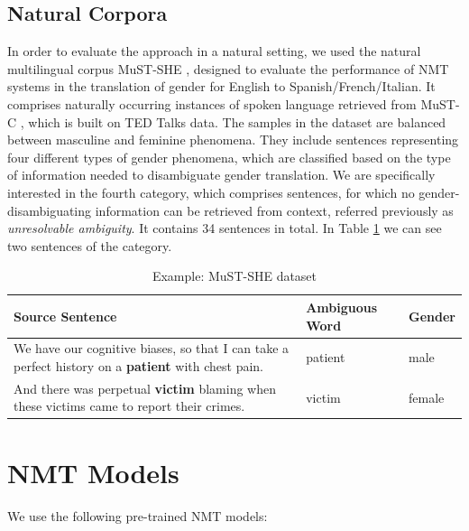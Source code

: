 \subsection{Natural Corpora}
\label{sec:Experiments:Natural_Corpora}

In order to evaluate the approach in a natural setting, we used the natural multilingual corpus MuST-SHE \parencite{MuST-SHE}, designed to evaluate the performance of NMT systems in the translation of gender for English to Spanish/French/Italian. It comprises naturally occurring instances of spoken language retrieved from MuST-C \parencite{MuST-C}, which is built on TED Talks data. The samples in the dataset are balanced between masculine and feminine phenomena. They include sentences representing four different types of gender phenomena, which are classified based
on the type of information needed to disambiguate gender translation. We are specifically interested in the fourth category, which comprises sentences, for which no gender-disambiguating information can be retrieved from context, referred previously as \textit{unresolvable ambiguity}. It contains 34 sentences in total. In Table \ref{tab:mustshe} we can see two sentences of the category. 

\begin{table} 
    \label{tab:mustshe}
    \begin{tabularx}{\linewidth}{|X|l|l|}
        \hline
        \textbf{Source Sentence} & \textbf{Ambiguous Word} & \textbf{Gender} \\ \hline
        We have our cognitive biases, so that I can take a perfect history on a \textbf{patient} with chest pain. & patient & male \\ \hline
        And there was perpetual \textbf{victim} blaming when these victims came to report their crimes. & victim & female \\ \hline
    \end{tabularx}
    \caption{Example: MuST-SHE dataset}
\end{table}

\section{NMT Models}
\label{sec:Experiments:Models}

We use the following pre-trained NMT models:

